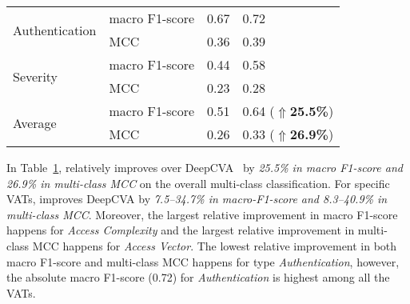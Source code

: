 \begin{table}[t]
\begin{center}
\begin{tabular}{l|p{1.9cm}<{\centering}|p{1.5cm}<{\centering}|p{1.5cm}<{\centering}}
			\hline
			\multirow{2}{*}{Authentication}  & macro F1-score                             &   0.67         & 0.72\\
			\cline{2-4}
			                                 & MCC                                 &   0.36         & 0.39\\
			\hline
			\multirow{2}{*}{Severity}        & macro F1-score                             &   0.44         & 0.58\\
			\cline{2-4}
			                                 & MCC                                 &   0.23         & 0.28\\
			\hline
			\hline
			\multirow{2}{*}{Average}         & macro F1-score                             &    0.51        & 0.64 ($\Uparrow${\bf 25.5\%})\\
			\cline{2-4}
			                                 & MCC                                 & 0.26           & 0.33 ($\Uparrow${\bf 26.9\%})\\
            \hline
		\end{tabular}
		\label{rq1_results}
	\end{center}
\end{table}

In Table~\ref{rq1_results}, {\tool} relatively improves over
DeepCVA~\cite{deepCVA-ase21} by {\em 25.5\% in macro F1-score and
26.9\% in multi-class MCC} on the overall multi-class 
classification. For specific VATs, {\tool} improves
DeepCVA by {\em 7.5--34.7\% in macro-F1-score and 8.3--40.9\% in
multi-class MCC}. Moreover, the largest relative improvement in macro
F1-score happens for {\em Access Complexity} and the largest relative
improvement in multi-class MCC happens for {\em Access Vector}. The
lowest relative improvement in both macro F1-score and multi-class MCC
happens for type {\em Authentication}, however, the absolute macro
F1-score (0.72) for {\em Authentication} is highest among all the
VATs.



